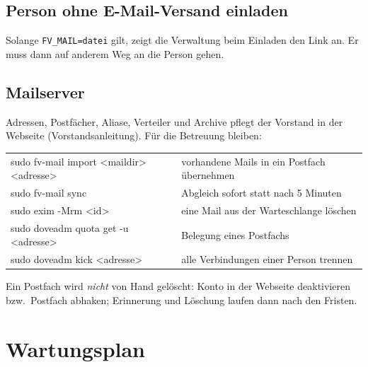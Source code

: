 \documentclass[a4paper,fontsize=10pt]{scrartcl}
\newcommand*{\cmd}[1]{\texttt{#1}}
\begin{document}
\subsection{Person ohne E-Mail-Versand einladen}

Solange \cmd{FV\_MAIL=datei} gilt, zeigt die Verwaltung beim Einladen den Link an.
Er muss dann auf anderem Weg an die Person gehen.

\subsection{Mailserver}

Adressen, Postfächer, Aliase, Verteiler und Archive pflegt der Vorstand in der
Webseite (Vorstandsanleitung). Für die Betreuung bleiben:

\begin{center}
\small
\begin{tabularx}{\textwidth}{@{}>{\ttfamily\raggedright}p{70mm}X@{}}
\toprule
sudo fv-mail import <maildir> <adresse> & vorhandene Mails in ein Postfach übernehmen \\
sudo fv-mail sync                       & Abgleich sofort statt nach 5 Minuten \\
sudo exim -Mrm <id>                     & eine Mail aus der Warteschlange löschen \\
sudo doveadm quota get -u <adresse>     & Belegung eines Postfachs \\
sudo doveadm kick <adresse>             & alle Verbindungen einer Person trennen \\
\bottomrule
\end{tabularx}
\end{center}

Ein Postfach wird \emph{nicht} von Hand gelöscht: Konto in der Webseite deaktivieren
bzw.\ Postfach abhaken; Erinnerung und Löschung laufen dann nach den Fristen.

\section{Wartungsplan}\label{sec:wartung}
\end{document}
